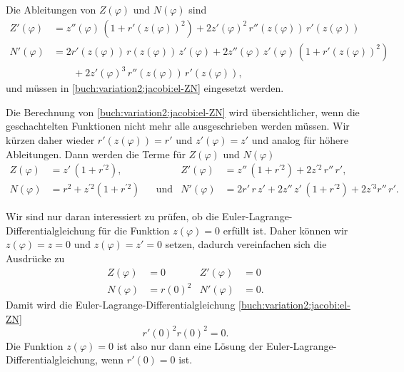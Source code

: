 Die Ableitungen von $Z(\varphi)$ und $N(\varphi)$ sind
\begin{align*}
Z'(\varphi)
&=
z''(\varphi)\,(1+r'(z(\varphi))^2)
+
2
z'(\varphi)^2\,r''(z(\varphi))\,r'(z(\varphi))
\\
N'(\varphi)
&=
2 r'(z(\varphi))\, r(z(\varphi))\, z'(\varphi)
+
2 z''(\varphi)\,z'(\varphi)\,(1+r'(z(\varphi))^2)
\\
&\qquad
+
2 z'(\varphi)^3\, r''(z(\varphi))\, r'(z(\varphi)),
\end{align*}
und müssen in \eqref{buch:variation2:jacobi:el-ZN} eingesetzt
werden. 

Die Berechnung von \eqref{buch:variation2:jacobi:el-ZN} wird
übersichtlicher, wenn die geschachtelten Funktionen nicht
mehr alle ausgeschrieben werden müssen.
Wir kürzen daher wieder $r'(z(\varphi)) = r'$ und $z'(\varphi)=z'$
und analog für höhere Ableitungen.
Dann werden die Terme für $Z(\varphi)$ und $N(\varphi)$
\begin{align*}
Z(\varphi)
&=
z'\,(1+r^{\prime 2}),
&&&
Z'(\varphi)
&=
z''\,(1+r^{\prime 2}) + 2z^{\prime 2}\,r''\,r',
\\
N(\varphi)
&=
r^2 + z^{\prime 2}(1+r^{\prime 2})
&&\text{und}&
N'(\varphi)
&=
2r'\,r\,z' + 2 z''\,z'\,(1+r^{\prime 2})+2 z^{\prime 3} r''\,r'.
\end{align*}

Wir sind nur daran interessiert zu prüfen, ob die
Euler-Lagrange-Differentialgleichung für die Funktion $z(\varphi)=0$
erfüllt ist.
Daher können wir $z(\varphi)=z=0$ und $z(\varphi)=z'=0$ setzen, dadurch
vereinfachen sich die Ausdrücke zu
\begin{align*}
Z(\varphi) &= 0
&
Z'(\varphi)
&=0
\\
N(\varphi) &= r(0)^2
&
N'(\varphi) &= 0.
\end{align*}
Damit wird die Euler-Lagrange-Differentialgleichung
\eqref{buch:variation2:jacobi:el-ZN}
\begin{equation}
r'(0)^2 r(0)^2 = 0.
\end{equation}
Die Funktion $z(\varphi)=0$ ist also nur dann eine Lösung der
Euler-Lagrange-Differential\-glei\-chung, wenn $r'(0)=0$ ist.

%
%
